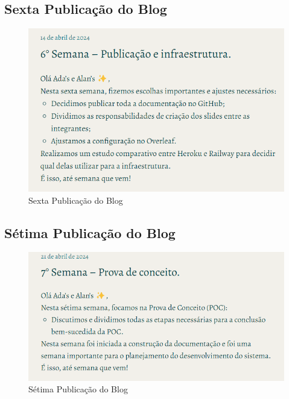 \begin{apendicesenv}
\subsection*{Sexta Publicação do Blog}
\begin{figure}[H]
    \centering
    \includegraphics[width=1.0\linewidth]{images/Post6.png}
    \caption{Sexta Publicação do Blog}
    \label{fig:sexta}
\end{figure}

\subsection*{Sétima Publicação do Blog}
\begin{figure}[H]
    \centering
    \includegraphics[width=1.0\linewidth]{images/Post7.png}
    \caption{Sétima Publicação do Blog}
    \label{fig:setima}
\end{figure}


\end{apendicesenv}

